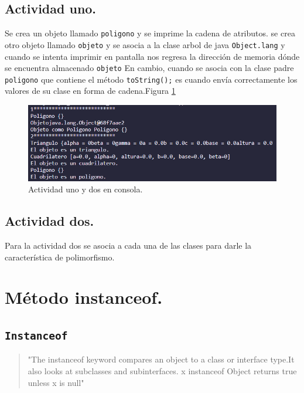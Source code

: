 \documentclass[conference]{IEEEtran}
\begin{document}
        \subsection{Actividad uno.}
        
            Se crea un objeto llamado \texttt{poligono} y se imprime la cadena de atributos.
            se crea otro objeto llamado \texttt{objeto} y se asocia a la clase arbol de java \texttt{Object.lang} y cuando se intenta imprimir en pantalla nos regresa la dirección de memoria dónde se encuentra almacenado \texttt{objeto} 
            En cambio, cuando se asocia con la clase padre \texttt{poligono} que contiene el método \texttt{toString();} es cuando envía correctamente los valores de su clase en forma de cadena.Figura \ref{fig2}

            \begin{figure}[htbp]
                \centerline{\includegraphics[scale=0.35]{./pics/3}}
                \caption{Actividad uno y dos en consola.}
                \label{fig2}
            \end{figure}

        \subsection{Actividad dos.}

            Para la actividad dos se asocia a cada una de las clases para darle la característica de polimorfismo.

    \section{Método instanceof.}
        \medskip
        \subsection{\texttt{Instanceof}} 
        
            \begin{quote}
                "The instanceof keyword compares an object to a class or interface type.It also looks at subclasses and subinterfaces. x instanceof Object returns true unless x is null" \cite{IEEEexample:OCPJSE}
            \end{quote}
\end{document}
